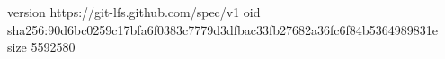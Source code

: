 version https://git-lfs.github.com/spec/v1
oid sha256:90d6bc0259c17bfa6f0383c7779d3dfbac33fb27682a36fc6f84b5364989831e
size 5592580
